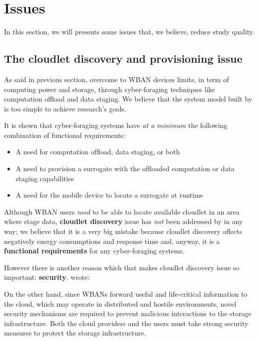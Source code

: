 \documentclass[sigchi]{acmart}
\begin{document}
\section{Issues}

In this section, we will presents some issues that, we believe, reduce \citep{MSAReport} study quality.

\subsection{The cloudlet discovery and provisioning issue}

As said in previous section, \citet{MSAReport} overcome to WBAN devices limits, in term of computing power and storage, through cyber-foraging techniques like computation offload and data staging. We believe that the system model built by \citet{MSAReport} is too simple to achieve research's goals.

It is shown \cite{DecisionModel} that cyber-foraging systems have \textit{at a minimum} the following combination of functional requirements:

\begin{itemize}

\item  A need for computation ofﬂoad, data staging, or both
\item  A need to provision a surrogate with the ofﬂoaded computation or data staging capabilities
\item  A need for the mobile device to locate a surrogate at runtime

\end{itemize}

Although WBAN users \textit{need} to be able to locate available cloudlet in an area where stage data, \textbf{cloudlet discovery} issue has \textit{not} been addressed by \citet{MSAReport} in any way; we believe that it is a very big mistake because cloudlet discovery affects negatively energy consumptions and response time and, anyway, it is a \textbf{functional requirements} for any cyber-foraging systems. 

However there is another reason which that makes cloudlet discovery issue so important: \textbf{security}. \citep{MSAReport} wrote:

\vspace{0.3cm}

\begin{quoting}[font=itshape, begintext={``}, endtext={''\cite[par.~3.3]{MSAReport}}]
On the other hand, since WBANs forward useful and life-critical information to the cloud, which may operate in distributed and hostile environments, novel security mechanisms are required to prevent malicious interactions to the storage infrastructure. Both the cloud providers and the users must take strong security measures to protect the storage infrastructure.
\end{quoting}
\end{document}
